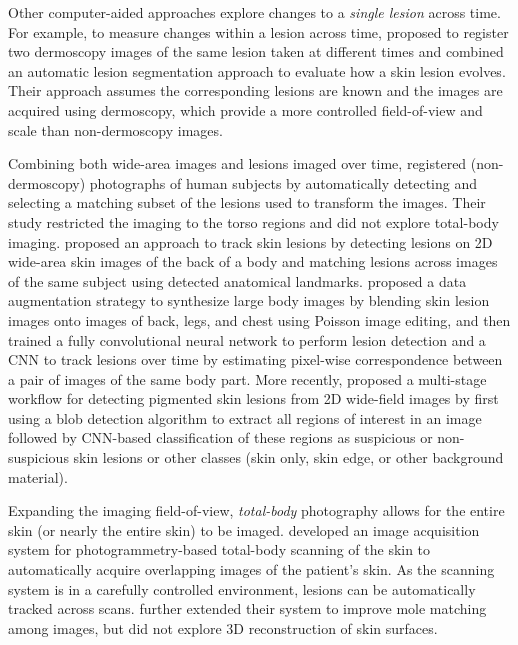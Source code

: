 \documentclass[journal]{IEEEtran}
\begin{document}
Other computer-aided approaches explore changes to a \emph{single lesion} across time. For example, to measure changes within a lesion across time, \citet{Navarro2019} proposed to register two dermoscopy images of the same lesion taken at different times and combined an automatic lesion segmentation approach to evaluate how a skin lesion evolves. Their approach assumes the corresponding lesions are known and the images are acquired using dermoscopy, which provide a more controlled field-of-view and scale than non-dermoscopy images.

Combining both wide-area images and lesions imaged over time, \citet{McGregor1998} registered (non-dermoscopy) photographs of human subjects by automatically detecting and selecting a matching subset of the lesions used to transform the images. Their study restricted the imaging to the torso regions and did not explore total-body imaging. \citet{Mirzaalian2016} proposed an approach to track skin lesions by detecting lesions on 2D wide-area skin images of the back of a body and matching lesions across images of the same subject using detected anatomical landmarks. \citet{li2016skin} proposed a data augmentation strategy to synthesize large body images by blending skin lesion images onto images of back, legs, and chest using Poisson image editing, and then trained a fully convolutional neural network to perform lesion detection and a CNN to track lesions over time by estimating pixel-wise correspondence between a pair of images of the same body part. More recently, \citet{Soenksen2021} proposed a multi-stage workflow for detecting pigmented skin lesions from 2D wide-field images by first using a blob detection algorithm to extract all regions of interest in an image followed by CNN-based classification of these regions as suspicious or non-suspicious skin lesions or other classes (skin only, skin edge, or other background material).

Expanding the imaging field-of-view, \emph{total-body} photography allows for the entire skin (or nearly the entire skin) to be imaged. \citet{Korotkov2015} developed an image acquisition system for photogrammetry-based total-body scanning of the skin to automatically acquire overlapping images of the patient's skin. As the scanning system is in a carefully controlled environment, lesions can be automatically tracked across scans. \citet{Korotkov2019} further extended their system to improve mole matching among images, but did not explore 3D reconstruction of skin surfaces. 
\end{document}

